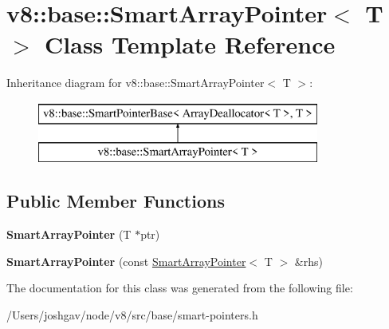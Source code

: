 \hypertarget{classv8_1_1base_1_1_smart_array_pointer}{}\section{v8\+:\+:base\+:\+:Smart\+Array\+Pointer$<$ T $>$ Class Template Reference}
\label{classv8_1_1base_1_1_smart_array_pointer}
Inheritance diagram for v8\+:\+:base\+:\+:Smart\+Array\+Pointer$<$ T $>$\+:\begin{figure}[H]
\begin{center}
\leavevmode
\includegraphics[height=2.000000cm]{classv8_1_1base_1_1_smart_array_pointer}
\end{center}
\end{figure}
\subsection*{Public Member Functions}
\begin{DoxyCompactItemize}
\item 
{\bfseries Smart\+Array\+Pointer} (T $\ast$ptr)\hypertarget{classv8_1_1base_1_1_smart_array_pointer_ac2bca4ebcc5088fcd30612818551eef9}{}\label{classv8_1_1base_1_1_smart_array_pointer_ac2bca4ebcc5088fcd30612818551eef9}

\item 
{\bfseries Smart\+Array\+Pointer} (const \hyperlink{classv8_1_1base_1_1_smart_array_pointer}{Smart\+Array\+Pointer}$<$ T $>$ \&rhs)\hypertarget{classv8_1_1base_1_1_smart_array_pointer_a6459f015ba05afc95408d96dc5d3e6c4}{}\label{classv8_1_1base_1_1_smart_array_pointer_a6459f015ba05afc95408d96dc5d3e6c4}

\end{DoxyCompactItemize}


The documentation for this class was generated from the following file\+:\begin{DoxyCompactItemize}
\item 
/\+Users/joshgav/node/v8/src/base/smart-\/pointers.\+h\end{DoxyCompactItemize}
